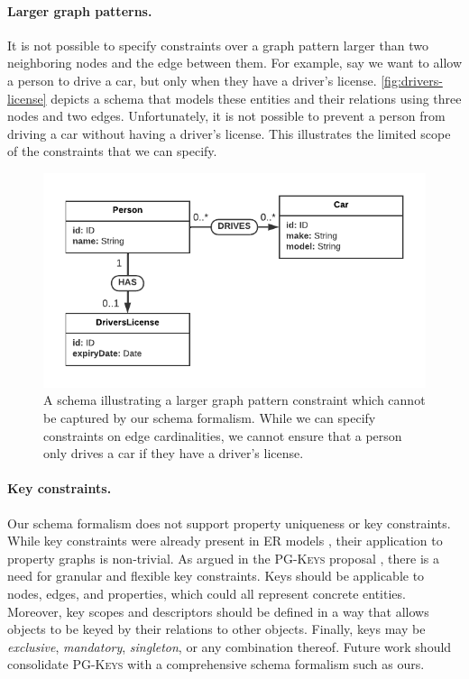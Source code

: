 \documentclass{report}
\theoremstyle{definition}
\begin{document}
\paragraph{Larger graph patterns.} It is not possible to specify constraints over a graph pattern larger than two neighboring nodes and the edge between them. For example, say we want to allow a person to drive a car, but only when they have a driver's license. \autoref{fig:drivers-license} depicts a schema that models these entities and their relations using three nodes and two edges. Unfortunately, it is not possible to prevent a person from driving a car without having a driver's license. This illustrates the limited scope of the constraints that we can specify.

\begin{figure}[t]
  \centering
  \includegraphics{figures/drivers-license.pdf}
  \caption[A schema illustrating a larger graph pattern constraint which cannot be captured by our schema formalism]{A schema illustrating a larger graph pattern constraint which cannot be captured by our schema formalism. While we can specify constraints on edge cardinalities, we cannot ensure that a person only drives a car if they have a driver's license.}
  \label{fig:drivers-license}
\end{figure}

\paragraph{Key constraints.} Our schema formalism does not support property uniqueness or key constraints. While key constraints were already present in ER models \citep{chen1976entity}, their application to property graphs is non-trivial. As argued in the \textsc{PG-Keys} proposal \citep{angles2021keys}, there is a need for granular and flexible key constraints. Keys should be applicable to nodes, edges, and properties, which could all represent concrete entities. Moreover, key scopes and descriptors should be defined in a way that allows objects to be keyed by their relations to other objects. Finally, keys may be \emph{exclusive}, \emph{mandatory}, \emph{singleton}, or any combination thereof. Future work should consolidate \textsc{PG-Keys} with a comprehensive schema formalism such as ours.
\end{document}
